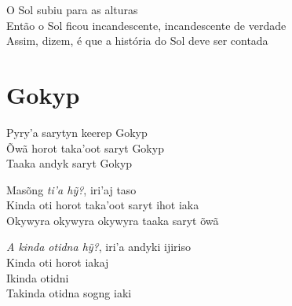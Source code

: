 \bigskip

\begin{linenumbers}\begingroup\raggedright
\noindent O Sol subiu para as alturas\\
Então o Sol ficou incandescente, incandescente de verdade\\
Assim, dizem, é que a história do Sol deve ser contada
\end{linenumbers}\endgroup

\chapter{Gokyp}

\begin{linenumbers}\begingroup\raggedright
\noindent Pyry'a sarytyn keerep Gokyp\\
Õwã horot taka'oot saryt Gokyp\\
Taaka andyk saryt Gokyp
\end{linenumbers}\endgroup

\bigskip

\begin{linenumbers}\begingroup\raggedright
\noindent Masõng \textit{ti'a hỹ?}, iri'aj taso\\
Kinda oti horot taka'oot saryt ihot iaka\\
Okywyra okywyra okywyra taaka saryt õwã
\end{linenumbers}\endgroup

\bigskip
\begin{linenumbers}\begingroup\raggedright

\noindent \textit{A kinda otidna hỹ?}, iri'a andyki ijiriso\\
Kinda oti horot iakaj\\
Ikinda otidni\\
Takinda otidna sogng iaki
\end{linenumbers}\endgroup

